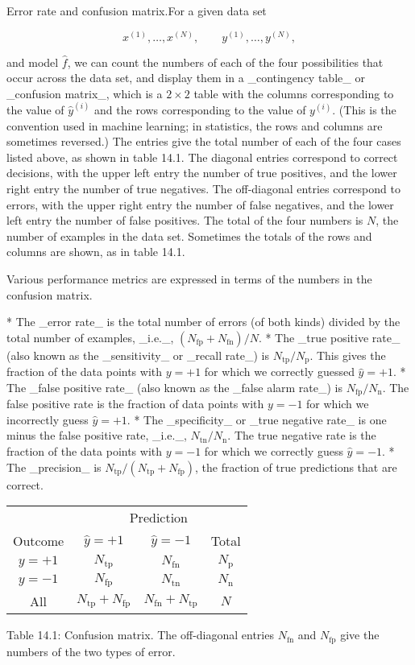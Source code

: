 
Error rate and confusion matrix.For a given data set

\[x^{(1)},\ldots,x^{(N)},\qquad y^{(1)},\ldots,y^{(N)},\]

and model \(\hat{f}\), we can count the numbers of each of the four possibilities that occur across the data set, and display them in a _contingency table_ or _confusion matrix_, which is a \(2\times 2\) table with the columns corresponding to the value of \(\hat{y}^{(i)}\) and the rows corresponding to the value of \(y^{(i)}\). (This is the convention used in machine learning; in statistics, the rows and columns are sometimes reversed.) The entries give the total number of each of the four cases listed above, as shown in table 14.1. The diagonal entries correspond to correct decisions, with the upper left entry the number of true positives, and the lower right entry the number of true negatives. The off-diagonal entries correspond to errors, with the upper right entry the number of false negatives, and the lower left entry the number of false positives. The total of the four numbers is \(N\), the number of examples in the data set. Sometimes the totals of the rows and columns are shown, as in table 14.1.

Various performance metrics are expressed in terms of the numbers in the confusion matrix.

* The _error rate_ is the total number of errors (of both kinds) divided by the total number of examples, _i.e._, \((N_{\mathrm{fp}}+N_{\mathrm{fn}})/N\).
* The _true positive rate_ (also known as the _sensitivity_ or _recall rate_) is \(N_{\mathrm{tp}}/N_{\mathrm{p}}\). This gives the fraction of the data points with \(y=+1\) for which we correctly guessed \(\hat{y}=+1\).
* The _false positive rate_ (also known as the _false alarm rate_) is \(N_{\mathrm{fp}}/N_{\mathrm{n}}\). The false positive rate is the fraction of data points with \(y=-1\) for which we incorrectly guess \(\hat{y}=+1\).
* The _specificity_ or _true negative rate_ is one minus the false positive rate, _i.e._, \(N_{\mathrm{tn}}/N_{\mathrm{n}}\). The true negative rate is the fraction of the data points with \(y=-1\) for which we correctly guess \(\hat{y}=-1\).
* The _precision_ is \(N_{\mathrm{tp}}/(N_{\mathrm{tp}}+N_{\mathrm{fp}})\), the fraction of true predictions that are correct.

\begin{table}
\begin{tabular}{c c c c} \hline \hline  & \multicolumn{3}{c}{Prediction} \\ \cline{2-4} Outcome & \(\hat{y}=+1\) & \(\hat{y}=-1\) & Total \\ \hline \(y=+1\) & \(N_{\mathrm{tp}}\) & \(N_{\mathrm{fn}}\) & \(N_{\mathrm{p}}\) \\ \(y=-1\) & \(N_{\mathrm{fp}}\) & \(N_{\mathrm{tn}}\) & \(N_{\mathrm{n}}\) \\ All & \(N_{\mathrm{tp}}+N_{\mathrm{fp}}\) & \(N_{\mathrm{fn}}+N_{\mathrm{tp}}\) & \(N\) \\ \hline \hline \end{tabular}
\end{table}
Table 14.1: Confusion matrix. The off-diagonal entries \(N_{\mathrm{fn}}\) and \(N_{\mathrm{fp}}\) give the numbers of the two types of error.

 
